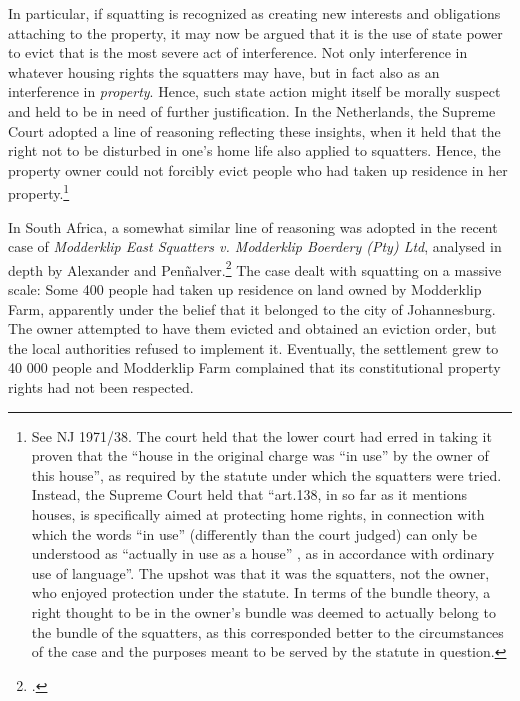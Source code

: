 \documentclass[12pt,a4paper]{book} %
\begin{document}
In particular, if squatting is recognized as creating new interests and obligations attaching to the property, it may now be argued that  it is the use of state power to evict that is the most severe act of interference. Not only interference in whatever housing rights the squatters may have, but in fact also as an interference in {\it property}. Hence, such state action might itself be morally suspect and held to be in need of further justification. In the Netherlands, the Supreme Court adopted a line of reasoning reflecting these insights, when it held that the right not to be disturbed in one's home life also applied to squatters. Hence, the property owner could not forcibly evict people who had taken up residence in her property.\footnote{See NJ 1971/38. The court held that the lower court had erred in taking it proven that the ``house in the original charge was ``in use'' by the owner of this house'', as required by the statute under which the squatters were tried. Instead, the Supreme Court held that ``art.138, in so far as it mentions houses, is specifically aimed at protecting home rights, in connection with which the words ``in use'' (differently than the court judged) can only be understood as ``actually in use as a house'' , as in accordance with ordinary use of language''. The upshot was that it was the squatters, not the owner, who enjoyed protection under the statute. In terms of the bundle theory, a right thought to be in the owner's bundle was deemed to actually belong to the bundle of the squatters, as this corresponded better to the circumstances of the case and the purposes meant to be served by the statute in question.}

In South Africa, a somewhat similar line of reasoning was adopted in the recent case of {\it Modderklip East Squatters v. Modderklip Boerdery (Pty) Ltd}, analysed in depth by Alexander and Pen\~{n}alver.\footcite[154-160]{alexander11} The case dealt with squatting on a massive scale: Some 400 people had taken up residence on land owned by Modderklip Farm, apparently under the belief that it belonged to the city of Johannesburg. The owner attempted to have them evicted and obtained an eviction order, but the local authorities refused to implement it. Eventually, the settlement grew to 40 000 people and Modderklip Farm complained that its constitutional property rights had not been respected.
\end{document}

